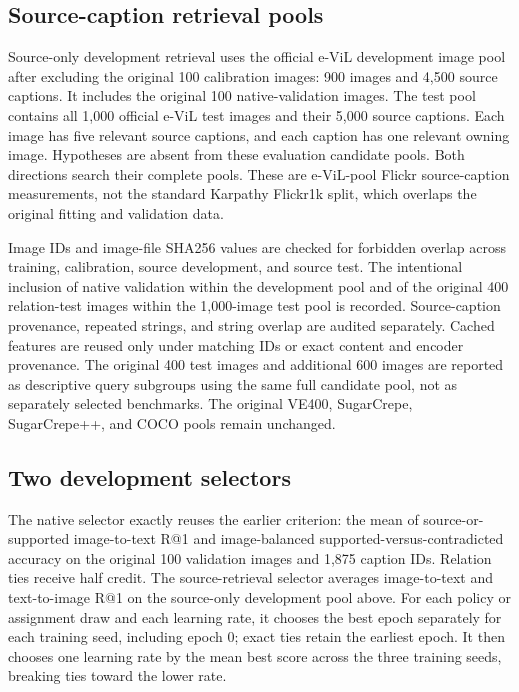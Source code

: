 \subsection{Source-caption retrieval pools}
\label{app:followuppools}
Source-only development retrieval uses the official e-ViL development image pool after excluding the original 100 calibration images: 900 images and 4,500 source captions. It includes the original 100 native-validation images. The test pool contains all 1,000 official e-ViL test images and their 5,000 source captions. Each image has five relevant source captions, and each caption has one relevant owning image. Hypotheses are absent from these evaluation candidate pools. Both directions search their complete pools. These are e-ViL-pool Flickr source-caption measurements, not the standard Karpathy Flickr1k split, which overlaps the original fitting and validation data.

Image IDs and image-file SHA256 values are checked for forbidden overlap across training, calibration, source development, and source test. The intentional inclusion of native validation within the development pool and of the original 400 relation-test images within the 1,000-image test pool is recorded. Source-caption provenance, repeated strings, and string overlap are audited separately. Cached features are reused only under matching IDs or exact content and encoder provenance. The original 400 test images and additional 600 images are reported as descriptive query subgroups using the same full candidate pool, not as separately selected benchmarks. The original VE400, SugarCrepe, SugarCrepe++, and COCO pools remain unchanged.

\subsection{Two development selectors}
\label{app:followupselection}
The native selector exactly reuses the earlier criterion: the mean of source-or-supported image-to-text R@1 and image-balanced supported-versus-contradicted accuracy on the original 100 validation images and 1,875 caption IDs. Relation ties receive half credit. The source-retrieval selector averages image-to-text and text-to-image R@1 on the source-only development pool above. For each policy or assignment draw and each learning rate, it chooses the best epoch separately for each training seed, including epoch 0; exact ties retain the earliest epoch. It then chooses one learning rate by the mean best score across the three training seeds, breaking ties toward the lower rate.

